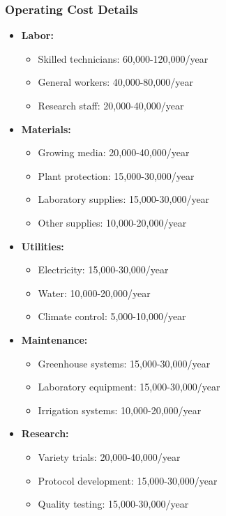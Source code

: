 \subsubsection{Operating Cost Details}
\begin{itemize}
    \item \textbf{Labor:}
    \begin{itemize}
        \item Skilled technicians: 60,000-120,000/year
        \item General workers: 40,000-80,000/year
        \item Research staff: 20,000-40,000/year
    \end{itemize}
    
    \item \textbf{Materials:}
    \begin{itemize}
        \item Growing media: 20,000-40,000/year
        \item Plant protection: 15,000-30,000/year
        \item Laboratory supplies: 15,000-30,000/year
        \item Other supplies: 10,000-20,000/year
    \end{itemize}
    
    \item \textbf{Utilities:}
    \begin{itemize}
        \item Electricity: 15,000-30,000/year
        \item Water: 10,000-20,000/year
        \item Climate control: 5,000-10,000/year
    \end{itemize}
    
    \item \textbf{Maintenance:}
    \begin{itemize}
        \item Greenhouse systems: 15,000-30,000/year
        \item Laboratory equipment: 15,000-30,000/year
        \item Irrigation systems: 10,000-20,000/year
    \end{itemize}
    
    \item \textbf{Research:}
    \begin{itemize}
        \item Variety trials: 20,000-40,000/year
        \item Protocol development: 15,000-30,000/year
        \item Quality testing: 15,000-30,000/year
    \end{itemize}
\end{itemize}

